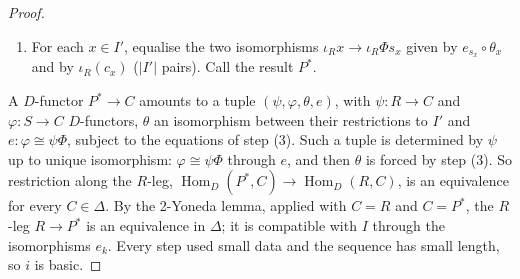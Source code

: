 \documentclass[11pt,a4paper]{amsart}
\theoremstyle{definition}
\theoremstyle{remark}
\newcommand{\Hom}{\operatorname{Hom}}
\begin{document}
\begin{proof}
\begin{enumerate}
\begin{itemize}
\item A localisation or an equalisation $S_\beta\to S_{\beta+1}$: restriction $\Hom_D(S_{\beta+1},C)\to\Hom_D(S_\beta,C)$ is fully faithful, so $M_{\beta+1}(C)\to M_\beta(C)$ is an isomorphism, and $P'_{\beta+1}=P'_\beta$.
\item An adjunction of a set $H$ of arrows: by Definition~\ref{d:H}(4), an isomorphism between $D$-functors on $S_{\beta+1}$ is an isomorphism between their restrictions to $S_\beta$ that is compatible with the arrows $h\in H$. So $P'_{\beta+1}$ is $P'_\beta$ with the two sides of the naturality square of $\varepsilon_\beta$ at each $h$ equalised ($|H|$ pairs).
\item A limit ordinal $\lambda$: let $P'_\lambda$ be the 2-colimit of the $P'_\beta$, $\beta<\lambda$. As $S_\lambda$ is the 2-colimit of the $S_\beta$, an isomorphism between $D$-functors on $S_\lambda$ is a compatible family of isomorphisms between their restrictions to the $S_\beta$; so $M_\lambda(C)$ is equivalent to the pseudo-limit of the $M_\beta(C)$, $\beta<\lambda$. So is $\Hom_D(P'_\lambda,C)$, the pseudo-limit of the equivalent chain $\Hom_D(P'_\beta,C)$. Pseudo-limits of equivalent chains are equivalent, and $\varepsilon_\lambda$ is the image of $\mathrm{id}_{P'_\lambda}$.
\end{itemize}
Put $P'=P'_\delta$ and let $e$ be the isomorphism $Q_\delta\iota_S\cong Q_\delta\iota_R\Phi$ given by $\varepsilon_\delta$, which is defined on all of $S$ since $T_\delta$ is an equivalence.
\item For each $x\in I'$, equalise the two isomorphisms $\iota_R x\to\iota_R\Phi s_x$ given by $e_{s_x}\circ\theta_x$ and by $\iota_R(c_x)$ ($|I'|$ pairs). Call the result $P^*$.
\end{enumerate}
A $D$-functor $P^*\to C$ amounts to a tuple $(\psi,\varphi,\theta,e)$, with $\psi\colon R\to C$ and $\varphi\colon S\to C$ $D$-functors, $\theta$ an isomorphism between their restrictions to $I'$ and $e\colon\varphi\cong\psi\Phi$, subject to the equations of step (3). Such a tuple is determined by $\psi$ up to unique isomorphism: $\varphi\cong\psi\Phi$ through $e$, and then $\theta$ is forced by step (3). So restriction along the $R$-leg, $\Hom_D(P^*,C)\to\Hom_D(R,C)$, is an equivalence for every $C\in\Delta$. By the 2-Yoneda lemma, applied with $C=R$ and $C=P^*$, the $R$-leg $R\to P^*$ is an equivalence in $\Delta$; it is compatible with $I$ through the isomorphisms $e_k$. Every step used small data and the sequence has small length, so $i$ is basic.
\end{proof}
\end{document}
